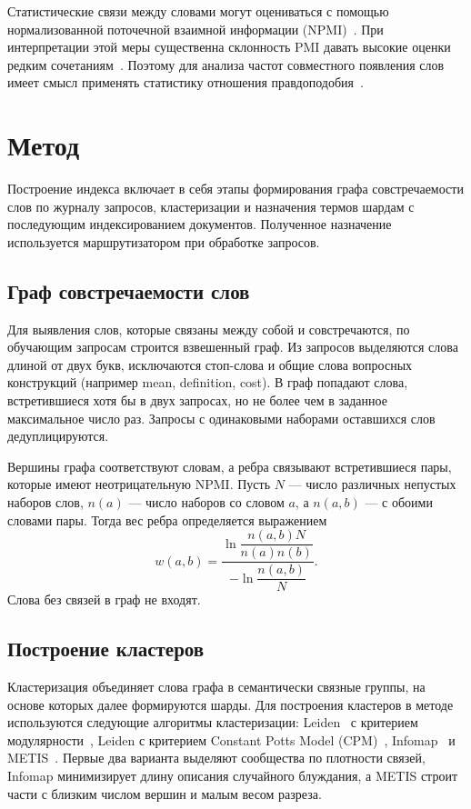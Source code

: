 \documentclass[10pt, a4paper, twoside]{article}
\begin{document}
\begin{ntvbody}
Статистические связи между словами могут оцениваться с помощью нормализованной поточечной взаимной информации (NPMI)~\cite{bouma2009}.
При интерпретации этой меры существенна склонность PMI давать высокие оценки редким сочетаниям~\cite{williams2022}.
Поэтому для анализа частот совместного появления слов имеет смысл применять статистику отношения правдоподобия~\cite{dunning1993}.

\section{Метод}

Построение индекса включает в себя этапы формирования графа совстречаемости слов по журналу запросов, кластеризации и назначения термов шардам с последующим индексированием документов.
Полученное назначение используется маршрутизатором при обработке запросов.

\subsection{Граф совстречаемости слов}
Для выявления слов, которые связаны между собой и совстречаются, по обучающим запросам строится взвешенный граф.
Из запросов выделяются слова длиной от двух букв, исключаются стоп-слова и общие слова вопросных конструкций (например \foreignlanguage{english}{mean, definition, cost}).
В граф попадают слова, встретившиеся хотя бы в двух запросах, но не более чем в заданное максимальное число раз.
Запросы с одинаковыми наборами оставшихся слов дедуплицируются.

Вершины графа соответствуют словам, а ребра связывают встретившиеся пары, которые имеют неотрицательную NPMI.
Пусть $N$ --- число различных непустых наборов слов, $n(a)$ --- число наборов со словом $a$, а $n(a,b)$ --- с обоими словами пары.
Тогда вес ребра определяется выражением
\begin{equation}
 w(a,b)=\frac{\ln\dfrac{n(a,b)N}{n(a)n(b)}}{-\ln\dfrac{n(a,b)}{N}}.
 \label{eq:npmi}
\end{equation}
Слова без связей в граф не входят.

\subsection{Построение кластеров}
Кластеризация объединяет слова графа в семантически связные группы, на основе которых далее формируются шарды.
Для построения кластеров в методе используются следующие алгоритмы кластеризации: Leiden~\cite{traag2019} с критерием модулярности~\cite{reichardt2006}, Leiden с критерием Constant Potts Model (CPM)~\cite{traag2011}, Infomap~\cite{rosvall2008} и METIS~\cite{karypis1998}.
Первые два варианта выделяют сообщества по плотности связей, Infomap минимизирует длину описания случайного блуждания, а METIS строит части с близким числом вершин и малым весом разреза.


\end{ntvbody}
\end{document}
